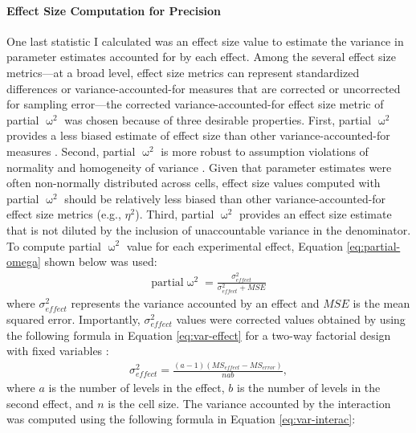 \documentclass[
12pt, %
twoside,
english]{guelphthesis}
\begin{document}
\hypertarget{effect-size-computation-for-precision}{%
\paragraph{Effect Size Computation for Precision}\label{effect-size-computation-for-precision}}

One last statistic I calculated was an effect size value to estimate the variance in parameter estimates accounted for by each effect. Among the several effect size metrics---at a broad level, effect size metrics can represent standardized differences or variance-accounted-for measures that are corrected or uncorrected for sampling error---the corrected variance-accounted-for effect size metric of partial \(\upomega^2\) was chosen because of three desirable properties. First, partial \(\upomega^2\) provides a less biased estimate of effect size than other variance-accounted-for measures \autocite{okada2013}. Second, partial \(\upomega^2\) is more robust to assumption violations of normality and homogeneity of variance \autocite{yigit2018}. Given that parameter estimates were often non-normally distributed across cells, effect size values computed with partial \(\upomega^2\) should be relatively less biased than other variance-accounted-for effect size metrics (e.g., \(\eta^2\)). Third, partial \(\upomega^2\) provides an effect size estimate that is not diluted by the inclusion of unaccountable variance in the denominator. To compute partial \(\upomega^2\) value for each experimental effect, Equation \ref{eq:partial-omega} shown below was used:
\begin{align}
\text{partial} \upomega^2 = \frac{\sigma^2_{effect}}{\sigma^2_{effect} + MSE} 
\label{eq:partial-omega}
\end{align}
\noindent where \(\sigma^2_{effect}\) represents the variance accounted by an effect and \(MSE\) is the mean squared error. Importantly, \(\sigma^2_{effect}\) values were corrected values obtained by using the following formula in Equation \ref{eq:var-effect} for a two-way factorial design with fixed variables \autocite{howell2009}:
\begin{align}
 \sigma^2_{effect} = \frac{(a - 1)(MS_{effect} - MS_{error})}{nab},
\label{eq:var-effect}
\end{align}
\noindent where \(a\) is the number of levels in the effect, \(b\) is the number of levels in the second effect, and \(n\) is the cell size. The variance accounted by the interaction was computed using the following formula in Equation \ref{eq:var-interac}:
\end{document}

